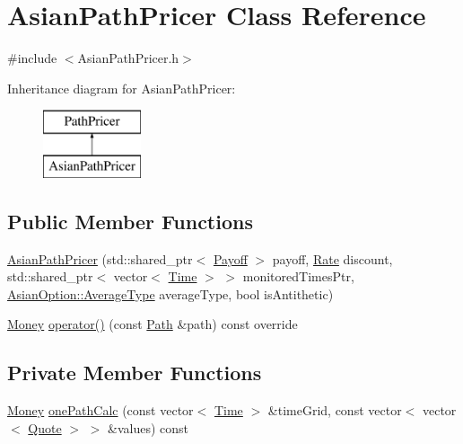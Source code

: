 \hypertarget{class_asian_path_pricer}{}\section{Asian\+Path\+Pricer Class Reference}
\label{class_asian_path_pricer}


{\ttfamily \#include $<$Asian\+Path\+Pricer.\+h$>$}

Inheritance diagram for Asian\+Path\+Pricer\+:\begin{figure}[H]
\begin{center}
\leavevmode
\includegraphics[height=2.000000cm]{class_asian_path_pricer}
\end{center}
\end{figure}
\subsection*{Public Member Functions}
\begin{DoxyCompactItemize}
\item 
\hyperlink{class_asian_path_pricer_a8e295461d8e635e39d8075810bcc1e6a}{Asian\+Path\+Pricer} (std\+::shared\+\_\+ptr$<$ \hyperlink{class_payoff}{Payoff} $>$ payoff, \hyperlink{_name_def_8h_a25bee43a162de339c81f3d1caf6b887d}{Rate} discount, std\+::shared\+\_\+ptr$<$ vector$<$ \hyperlink{_name_def_8h_ac2d3e0ba793497bcca555c7c2cf64ff3}{Time} $>$ $>$ monitored\+Times\+Ptr, \hyperlink{class_asian_option_add7292791bf85820ff9fdbfd4407f3b9}{Asian\+Option\+::\+Average\+Type} average\+Type, bool is\+Antithetic)
\item 
\hyperlink{_name_def_8h_a5a9d48c16a694e9a2d9f1eca730dc8c5}{Money} \hyperlink{class_asian_path_pricer_adb10ce912ab34560d762ce0523ae394e}{operator()} (const \hyperlink{class_path}{Path} \&path) const override
\end{DoxyCompactItemize}
\subsection*{Private Member Functions}
\begin{DoxyCompactItemize}
\item 
\hyperlink{_name_def_8h_a5a9d48c16a694e9a2d9f1eca730dc8c5}{Money} \hyperlink{class_asian_path_pricer_a33d53acde0a8553f4adcee70c47f50b4}{one\+Path\+Calc} (const vector$<$ \hyperlink{_name_def_8h_ac2d3e0ba793497bcca555c7c2cf64ff3}{Time} $>$ \&time\+Grid, const vector$<$ vector$<$ \hyperlink{_name_def_8h_a642a6c5fd87319d922637de0e0bb0305}{Quote} $>$ $>$ \&values) const
\end{DoxyCompactItemize}
